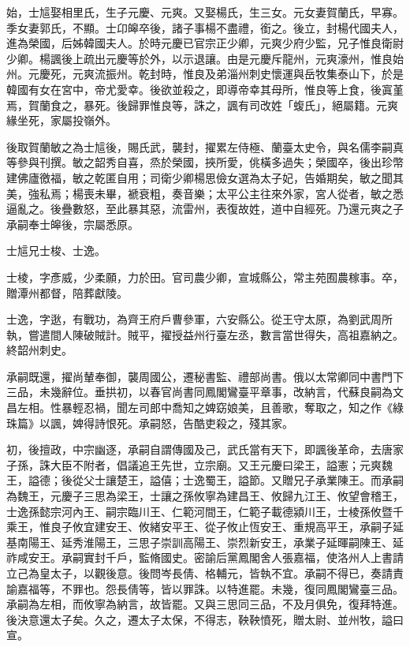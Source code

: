 \begin{pinyinscope}
 始，士訄娶相里氏，生子元慶、元爽。又娶楊氏，生三女。元女妻賀蘭氏，早寡。季女妻郭氏，不顯。士卬皞卒後，諸子事楊不盡禮，銜之。後立，封楊代國夫人，進為榮國，后姊韓國夫人。於時元慶已官宗正少卿，元爽少府少監，兄子惟良衛尉少卿。楊諷後上疏出元慶等於外，以示退讓。由是元慶斥龍州，元爽濠州，惟良始州。元慶死，元爽流振州。乾封時，惟良及弟淄州刺史懷運與岳牧集泰山下，於是韓國有女在宮中，帝尤愛幸。後欲並殺之，即導帝幸其母所，惟良等上食，後寘堇焉，賀蘭食之，暴死。後歸罪惟良等，誅之，諷有司改姓「蝮氏」，絕屬籍。元爽緣坐死，家屬投嶺外。



 後取賀蘭敏之為士訄後，賜氏武，襲封，擢累左侍極、蘭臺太史令，與名儒李嗣真等參與刊撰。敏之韶秀自喜，烝於榮國，挾所愛，佻橫多過失；榮國卒，後出珍幣建佛廬徼福，敏之乾匿自用；司衛少卿楊思儉女選為太子妃，告婚期矣，敏之聞其美，強私焉；楊喪未畢，褫衰粗，奏音樂；太平公主往來外家，宮人從者，敏之悉逼亂之。後疊數怒，至此暴其惡，流雷州，表復故姓，道中自經死。乃還元爽之子承嗣奉士皞後，宗屬悉原。



 士訄兄士梭、士逸。



 士棱，字彥威，少柔願，力於田。官司農少卿，宣城縣公，常主苑囿農稼事。卒，贈潭州都督，陪葬獻陵。



 士逸，字逖，有戰功，為齊王府戶曹參軍，六安縣公。從王守太原，為劉武周所執，嘗遣間人陳破賊計。賊平，擢授益州行臺左丞，數言當世得失，高祖嘉納之。終韶州刺史。



 承嗣既還，擢尚輦奉御，襲周國公，遷秘書監、禮部尚書。俄以太常卿同中書門下三品，未幾辭位。垂拱初，以春官尚書同鳳閣鸞臺平章事，改納言，代蘇良嗣為文昌左相。性暴輕忍禍，聞左司郎中喬知之婢窈娘美，且善歌，奪取之，知之作《綠珠篇》以諷，婢得詩恨死。承嗣怒，告酷吏殺之，殘其家。



 初，後擅政，中宗幽逐，承嗣自謂傳國及己，武氏當有天下，即諷後革命，去唐家子孫，誅大臣不附者，倡議追王先世，立宗廟。又王元慶曰梁王，謚憲；元爽魏王，謚德；後從父士讓楚王，謚僖；士逸蜀王，謚節。又贈兄子承業陳王。而承嗣為魏王，元慶子三思為梁王，士讓之孫攸寧為建昌王、攸歸九江王、攸望會稽王，士逸孫懿宗河內王、嗣宗臨川王、仁範河間王，仁範子載德潁川王，士棱孫攸暨千乘王，惟良子攸宜建安王、攸緒安平王、從子攸止恆安王、重規高平王，承嗣子延基南陽王、延秀淮陽王，三思子崇訓高陽王、崇烈新安王，承業子延暉嗣陳王、延祚咸安王。承嗣實封千戶，監脩國史。密諭后黨鳳閣舍人張嘉福，使洛州人上書請立己為皇太子，以觀後意。後問岑長倩、格輔元，皆執不宜。承嗣不得已，奏請責諭嘉福等，不罪也。怨長倩等，皆以罪誅。以特進罷。未幾，復同鳳閣鸞臺三品。承嗣為左相，而攸寧為納言，故皆罷。又與三思同三品，不及月俱免，復拜特進。後決意還太子矣。久之，遷太子太保，不得志，鞅鞅憤死，贈太尉、並州牧，謚曰宣。




\end{pinyinscope}
